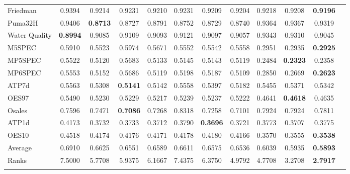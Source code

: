 \documentclass[reqno]{vcuthesis}
\numberwithin{equation}{chapter}
\begin{document}
\begin{table}[b!]
{\begin{tabular}{l@{\extracolsep{\fill}}ccccccccccc}
Friedman &0.9394 &0.9214 &0.9231 &0.9210 &0.9231 &0.9209 &0.9204 &0.9218 &0.9208 &\textbf{0.9196} &  \\
Puma32H &0.9406 &\textbf{0.8713} &0.8727 &0.8791 &0.8752 &0.8729 &0.8740 &0.9364 &0.9367 &0.9319 &  \\
Water Quality &\textbf{0.8994} &0.9085 &0.9109 &0.9093 &0.9121 &0.9097 &0.9057 &0.9343 &0.9310 &0.9045 &  \\
M5SPEC &0.5910 &0.5523 &0.5974 &0.5671 &0.5552 &0.5542 &0.5558 &0.2951 &0.2935 &\textbf{0.2925} &  \\
MP5SPEC &0.5522 &0.5120 &0.5683 &0.5133 &0.5145 &0.5143 &0.5119 &0.2484 &\textbf{0.2323} &0.2358 &  \\
MP6SPEC &0.5553 &0.5152 &0.5686 &0.5119 &0.5198 &0.5187 &0.5109 &0.2850 &0.2669 &\textbf{0.2623} &  \\
ATP7d &0.5563 &0.5308 &\textbf{0.5141} &0.5142 &0.5558 &0.5397 &0.5182 &0.5455 &0.5371 &0.5342 &  \\
OES97 &0.5490 &0.5230 &0.5229 &0.5217 &0.5239 &0.5237 &0.5222 &0.4641 &\textbf{0.4618} &0.4635 &  \\
Osales &0.7596 &0.7471 &\textbf{0.7086} &0.7268 &0.8318 &0.7258 &0.7101 &0.7924 &0.7924 &0.7811 &  \\
ATP1d &0.4173 &0.3732 &0.3733 &0.3712 &0.3790 &\textbf{0.3696} &0.3721 &0.3773 &0.3707 &0.3775 &  \\
OES10 &0.4518 &0.4174 &0.4176 &0.4171 &0.4178 &0.4180 &0.4166 &0.3570 &0.3555 &\textbf{0.3538} &  \\
\noalign{\smallskip}\hline\noalign{\smallskip}
Average &0.6910 &0.6625 &0.6551 &0.6589 &0.6611 &0.6575 &0.6536 &0.6039 &0.5935 &\textbf{0.5893} &  \\
Ranks &7.5000 &5.7708 &5.9375 &6.1667 &7.4375 &6.3750 &4.9792 &4.7708 &3.2708 &\textbf{2.7917} &  \\
\noalign{\smallskip}\hline
\end{tabular}}
\centering \small
{}
\end{table}
\end{document}
